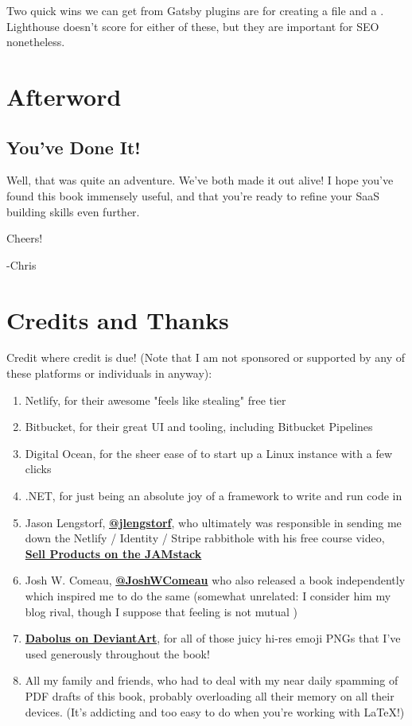 \documentclass[paper=6in:9in,pagesize=pdftex,headinclude=on,footinclude=on,12pt]{scrbook}
\newcommand{\link}[2]{\textbf{\textcolor{monokaiPink}{\href{#2}{#1}}}}
\begin{document}
Two quick wins we can get from Gatsby plugins are for creating a  file and a . Lighthouse doesn't score for either of these, but they are important for SEO nonetheless.

\chapter*{Afterword}

\section*{You've Done It!}

Well, that was quite an adventure. We've both made it out alive! I hope you've found this book immensely useful, and that you're ready to refine your SaaS building skills even further.

Cheers! \beers

-Chris

\chapter*{Credits and Thanks}

Credit where credit is due! (Note that I am not sponsored or supported by any of these platforms or individuals in anyway):

\begin{enumerate}
\item Netlify, for their awesome "feels like stealing" free tier
\item Bitbucket, for their great UI and tooling, including Bitbucket Pipelines
\item Digital Ocean, for the sheer ease of to start up a Linux instance with a few clicks
\item .NET, for just being an absolute joy of a framework to write and run code in
\item Jason Lengstorf, \link{@jlengstorf}{https://twitter.com/jlengstorf}, who ultimately was responsible in sending me down the Netlify / Identity / Stripe rabbithole with his free course video, \link{Sell Products on the JAMstack}{https://www.youtube.com/watch?v=0fQPbiqG9bY}
\item Josh W. Comeau, \link{@JoshWComeau}{https://twitter.com/JoshWComeau} who also released a book independently which inspired me to do the same (somewhat unrelated: I consider him my blog rival, though I suppose that feeling is not mutual \joy)
\item \link{Dabolus on DeviantArt}{https://www.deviantart.com/dabolus}, for all of those juicy hi-res emoji PNGs that I've used generously throughout the book!
\item All my family and friends, who had to deal with my near daily spamming of PDF drafts of this book, probably overloading all their memory on all their devices. (It's addicting and too easy to do when you're working with LaTeX!) 
\end{enumerate}
\end{document}
